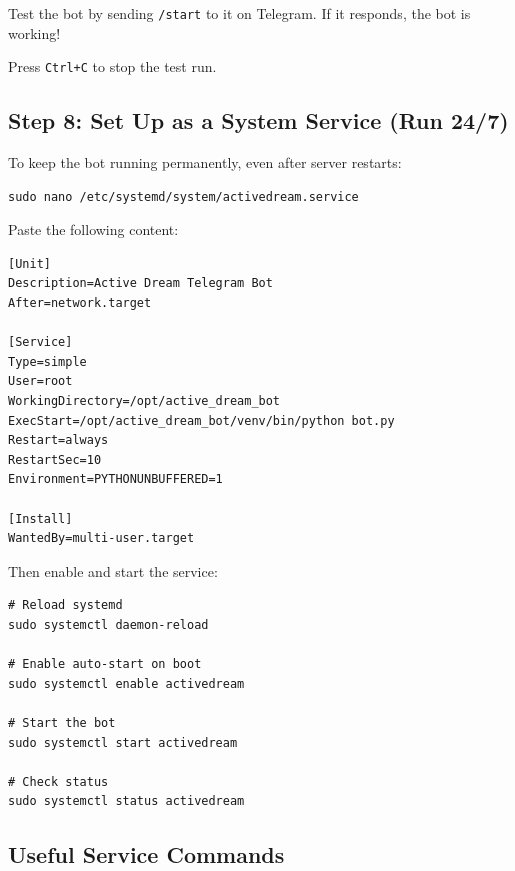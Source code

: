 Test the bot by sending \texttt{/start} to it on Telegram. If it responds, the bot is working!

Press \texttt{Ctrl+C} to stop the test run.

\subsection{Step 8: Set Up as a System Service (Run 24/7)}

To keep the bot running permanently, even after server restarts:

\begin{lstlisting}[style=bashstyle, title=Create Systemd Service]
sudo nano /etc/systemd/system/activedream.service
\end{lstlisting}

Paste the following content:

\begin{lstlisting}[style=envstyle, title=activedream.service]
[Unit]
Description=Active Dream Telegram Bot
After=network.target

[Service]
Type=simple
User=root
WorkingDirectory=/opt/active_dream_bot
ExecStart=/opt/active_dream_bot/venv/bin/python bot.py
Restart=always
RestartSec=10
Environment=PYTHONUNBUFFERED=1

[Install]
WantedBy=multi-user.target
\end{lstlisting}

Then enable and start the service:

\begin{lstlisting}[style=bashstyle, title=Enable and Start Service]
# Reload systemd
sudo systemctl daemon-reload

# Enable auto-start on boot
sudo systemctl enable activedream

# Start the bot
sudo systemctl start activedream

# Check status
sudo systemctl status activedream
\end{lstlisting}

\subsection{Useful Service Commands}

